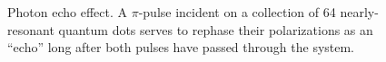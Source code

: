 \documentclass[conference]{IEEEtran}
\begin{document}
\begin{figure}
  \centering
  
  \caption{\label{fig:echo} Photon echo effect. 
    A $\pi$-pulse incident on a collection of 64 nearly-resonant quantum dots serves to rephase their polarizations as an ``echo'' long after both pulses have passed through the system.
  }
\end{figure}


{}

\end{document}
